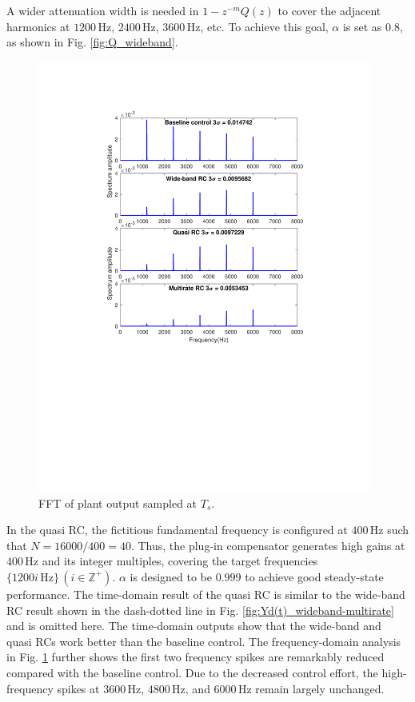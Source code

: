 \documentclass [11pt, proquest] {uwthesis}[2020/02/24]
\begin{document}
A wider attenuation width is needed in $1-z^{-m}Q(z)$ to cover the
adjacent harmonics at $1200\,\text{Hz}$, $2400\,\text{Hz}$, $3600\,\text{Hz}$,
etc. To achieve this goal, $\alpha$ is set as 0.8, as shown in Fig.
\ref{fig:Q_wideband}.
\begin{figure}[!ht]
\begin{centering}
\includegraphics[width=11cm]{Fractional-order-RC/Spectrum_all}
\par\end{centering}
\caption{\label{fig:FFT}FFT of plant output sampled at $T_{s}$.}
\end{figure}
In the quasi RC, the fictitious fundamental frequency is configured
at $400\,\text{Hz}$ such that $N=16000/400=40$. Thus, the plug-in
compensator generates high gains at $400\,\text{Hz}$ and its integer
multiples, covering the target frequencies $\{1200i\,\text{Hz}\}\,(i\in\mathbb{Z}^{+})$.
$\alpha$ is designed to be $0.999$ to achieve good steady-state
performance. The time-domain result of the quasi RC is similar to
the wide-band RC result shown in the dash-dotted line in Fig. \ref{fig:Yd(t)_wideband-multirate}
and is omitted here. The time-domain outputs show that the wide-band
and quasi RCs work better than the baseline control. The frequency-domain
analysis in Fig. \ref{fig:FFT} further shows the first two frequency
spikes are remarkably reduced compared with the baseline control.
Due to the decreased control effort, the high-frequency spikes at
$3600\,\text{Hz}$, $4800\,\text{Hz}$, and $6000\,\text{Hz}$ remain
largely unchanged. 
\end{document}
